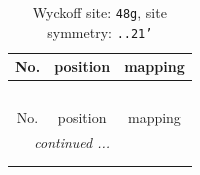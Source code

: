 \documentclass[fleqn,8pt]{jsarticle}
\begin{document}
\renewcommand{\arraystretch}{1.2}
\begin{longtable}{ccc}
\caption{Wyckoff site: {\tt 48g}, site symmetry: {\tt ..21'}}
 \\
 \hline \hline
No. & position & mapping \\ \hline \endfirsthead

\multicolumn{2}{l}{\tablename\ \thetable{}} \\
 \hline \hline
No. & position & mapping \\ \hline \endhead

 \hline \hline
\multicolumn{2}{r}{\footnotesize\it continued ...} \\ \endfoot

 \hline \hline
\multicolumn{2}{r}{} \\ \endlastfoot


\end{longtable}
\end{document}
